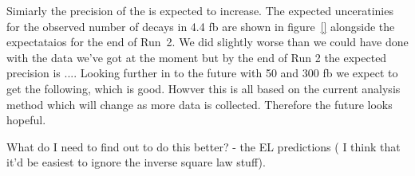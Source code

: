 Simiarly the precision of the \el is expected to increase. The expected unceratinies for the observed number of decays in 4.4 fb are shown in figure~\ref{} alongside the expectataios for the end of Run~2. We did slightly worse than we could have done with the data we've got at the moment but by the end of Run 2 the expected precision is .... Looking further in to the future with 50 and 300 fb we expect to get the following, which is good. Howver this is all based on the current analysis method which will change as more data is collected. Therefore the future looks hopeful.

What do I need to find out to do this better?
- the EL predictions ( I think that it'd be easiest to ignore the inverse square law stuff).
